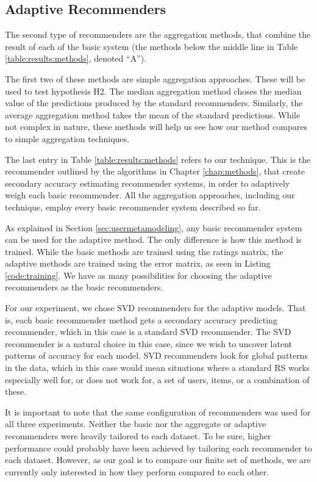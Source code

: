 \subsection{Adaptive Recommenders}

The second type of recommenders are the aggregation methods, 
that combine the result of each of the basic system
(the methods below the middle line in Table \ref{table:results:methods},
denoted ``A'').

The first two of these methods are simple aggregation approaches.
These will be used to test hypothesis H2.
The median aggregation method choses the median value of the predictions
produced by the standard recommenders.
Similarly, the average aggregation method takes the mean of the
standard predictions.
While not complex in nature, these methods
will help us see how our method compares to simple aggregation techniques.

The last entry in Table \ref{table:results:methods}
refers to our technique. 
This is the recommender outlined by the algorithms
in Chapter \ref{chap:methods},
that create secondary accuracy estimating recommender systems,
in order to adaptively weigh each basic recommender.
All the aggregation approaches, including our technique,
employ every basic recommender system described so far.

As explained in Section \ref{sec:usermetamodeling},
any basic recommender system can be used for the adaptive method.
The only difference is how this method is trained.
While the basic methods are trained using the ratings matrix,
the adaptive methods are trained using the error matrix,
as seen in Listing \ref{code:training}.
We have as many possibilities for choosing
the adaptive recommenders as the basic recommenders.

For our experiment, we chose SVD recommenders for the adaptive models.
That is, each basic recommender method gets a secondary 
accuracy predicting recommender, which in this case is a standard SVD recommender.
The SVD recommender is a natural choice in this case,
since we wish to uncover latent patterns of accuracy for each model.
SVD recommenders look for global patterns in the data,
which in this case would mean situations where a standard RS
works especially well for, or does not work for,
a set of users, items, or a combination of these.

It is important to note that the same configuration of recommenders was used for all three experiments.
Neither the basic nor the aggregate or adaptive recommenders were heavily tailored
to each dataset. To be sure, higher performance could probably have been achieved
by tailoring each recommender to each dataset. 
However, as our goal is to compare our finite set of methods, 
we are currently only interested in how they perform compared to each other.


